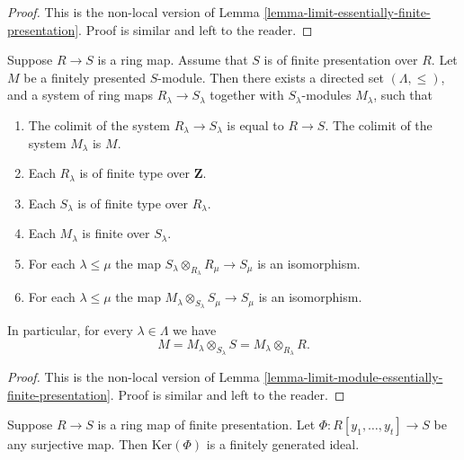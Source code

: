 \begin{proof}
This is the non-local version of
Lemma \ref{lemma-limit-essentially-finite-presentation}.
Proof is similar and left to the reader.
\end{proof}

\begin{lemma}
\label{lemma-limit-module-finite-presentation}
Suppose $R \to S$ is a ring map.
Assume that $S$ is of finite presentation over $R$.
Let $M$ be a finitely presented $S$-module.
Then there exists a directed set $(\Lambda, \leq)$, and
a system of ring maps $R_\lambda \to S_\lambda$
together with $S_\lambda$-modules $M_\lambda$,
such that
\begin{enumerate}
\item The colimit of the system $R_\lambda \to S_\lambda$
is equal to $R \to S$. The colimit of the system $M_\lambda$
is $M$.
\item Each $R_\lambda$ is of finite type
over $\mathbf{Z}$.
\item Each $S_\lambda$ is of finite type
over $R_\lambda$.
\item Each $M_\lambda$ is finite over $S_\lambda$.
\item For each $\lambda \leq \mu$ the map
$S_\lambda \otimes_{R_\lambda} R_\mu \to S_\mu$
is an isomorphism.
\item For each $\lambda \leq \mu$ the map
$M_\lambda \otimes_{S_\lambda} S_\mu \to S_\mu$
is an isomorphism.
\end{enumerate}
In particular, for every $\lambda \in \Lambda$ we have
$$
M = M_\lambda \otimes_{S_\lambda} S
= M_\lambda \otimes_{R_\lambda} R.
$$
\end{lemma}

\begin{proof}
This is the non-local version of
Lemma \ref{lemma-limit-module-essentially-finite-presentation}.
Proof is similar and left to the reader.
\end{proof}

\begin{lemma}
\label{lemma-finite-presentation-independent}
Suppose $R \to S$ is a ring map of finite presentation.
Let $\Phi : R[y_1,\ldots, y_t] \to S$ be any surjective map.
Then $\text{Ker}(\Phi)$ is a finitely generated ideal.
\end{lemma}

